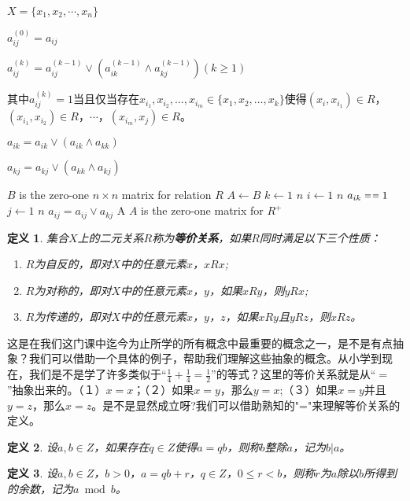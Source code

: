 \documentclass{article}
\newtheorem{Def}{定义}
\begin{document}
\begin{CJK*}{UTF8}{gbsn}
  $X=\{x_1,x_2,\cdots,x_n\}$

  $a_{ij}^{(0)}=a_{ij}$


  $a_{ij}^{(k)}= a_{ij}^{(k-1)}\lor (a_{ik}^{(k-1)}\land a_{kj}^{(k-1)}) (k\geq 1)$

  其中$a_{ij}^{(k)}=1$当且仅当存在$x_{i_1},x_{i_2},\ldots,x_{i_m}\in \{x_1,x_2,\ldots,x_k\}$使得$(x_i,x_{i_1})\in R$，$(x_{i_1},x_{i_2})\in R$，$\cdots$，$(x_{i_m},x_j)\in R$。


  $a_{ik} = a_{ik} \lor (a_{ik} \land a_{kk})$

  $a_{kj} = a_{kj} \lor (a_{kk} \land a_{kj})$

    \begin{codebox}
    \zi \Comment $B$ is the zero-one $n \times n$ matrix for relation $R$
    \li $A \gets B$
    \li \For $k \gets 1$ \To $n$
    \li \Do
    \For $i \gets 1$ \To $n$
    \li \Do
     \If $a_{ik} \isequal 1$
    \li \Then
    \For $j \gets 1$ \To $n$
    \li \Do
    $a_{ij} = a_{ij} \lor a_{kj}$
    \End
    \End
    \End
    \End
    \li \Return A \Comment $A$ is the zero-one matrix for $R^+$
  \end{codebox}
  \begin{Def}
    集合$X$上的二元关系$R$称为{\bfseries 等价关系}，如果$R$同时满足以下三个性质：
    \begin{enumerate}
    \item $R$为自反的，即对$X$中的任意元素$x$，$xRx$;
    \item $R$为对称的，即对$X$中的任意元素$x$，$y$，如果$xRy$，则$yRx$;
    \item $R$为传递的，即对$X$中的任意元素$x$，$y$，$z$，如果$xRy$且$yRz$，则$xRz$。
    \end{enumerate}
  \end{Def}

  这是在我们这门课中迄今为止所学的所有概念中最重要的概念之一，是不是有点抽象？我们可以借助一个具体的例子，帮助我们理解这些抽象的概念。从小学到现在，我们是不是学了许多类似于“$\frac{1}{4}+\frac{1}{4}=\frac{1}{2}$”的等式？这里的等价关系就是从“$=$”抽象出来的。（１）$x=x$；（２）如果$x=y$，那么$y=x$;（３）如果$x=y$并且$y=z$，那么$x=z$。是不是显然成立呀?我们可以借助熟知的"="来理解等价关系的定义。
  \begin{Def}
    设$a,b\in Z$，如果存在$q\in Z$使得$a=qb$，则称$b$整除$a$，记为$b|a$。
  \end{Def}
  \begin{Def}
    设$a,b\in Z$，$b>0$，$a=qb+r$，$q\in Z$，$0\leq r<b$，则称$r$为$a$除以$b$所得到的余数，记为$a\bmod b$。
  \end{Def}
  

\end{CJK*}
\end{document}
